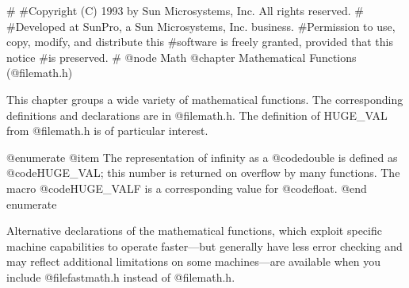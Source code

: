 #
#Copyright (C) 1993 by Sun Microsystems, Inc. All rights reserved.
#
#Developed at SunPro, a Sun Microsystems, Inc. business.
#Permission to use, copy, modify, and distribute this
#software is freely granted, provided that this notice
#is preserved.
#
@node Math
@chapter Mathematical Functions (@file{math.h})

This chapter groups a wide variety of mathematical functions.  The
corresponding definitions and declarations are in @file{math.h}.
The definition of HUGE_VAL from @file{math.h} is of particular interest.

@enumerate
@item
The representation of infinity as a @code{double} is defined as
@code{HUGE_VAL}; this number is returned on overflow by many functions.
The macro @code{HUGE_VALF} is a corresponding value for @code{float}.
@end enumerate

Alternative declarations of the mathematical functions, which exploit
specific machine capabilities to operate faster---but generally have
less error checking and may reflect additional limitations on some
machines---are available when you include @file{fastmath.h} instead of
@file{math.h}.

